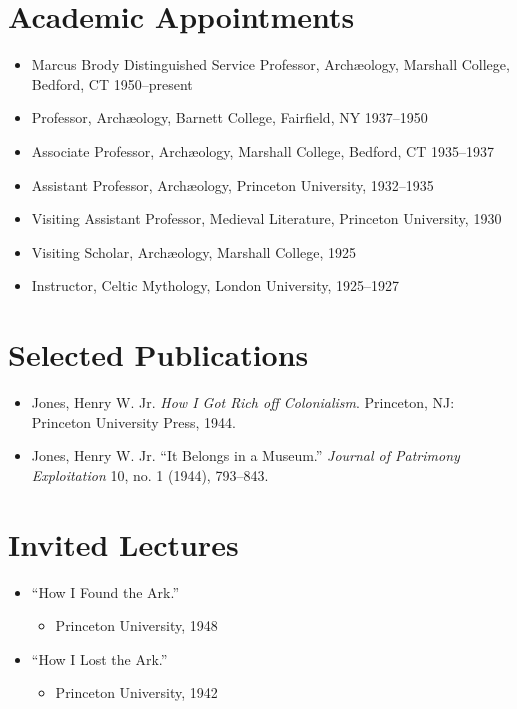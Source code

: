 \documentclass[%
    11pt,
  oneside
  ]{memoir}
\let\oldsection\section
\renewcommand{\section}[1]{%
  \oldsection{#1}
  \leavevmode
  \par
  \vspace{\dimexpr-\baselineskip-\parskip}
}
\begin{document}
\hypertarget{academic-appointments}{%
\section{Academic Appointments}\label{academic-appointments}}

\begin{itemize}
\tightlist
\item
  Marcus Brody Distinguished Service Professor, Archæology, Marshall
  College, Bedford, CT 1950--present
\item
  Professor, Archæology, Barnett College, Fairfield, NY 1937--1950
\item
  Associate Professor, Archæology, Marshall College, Bedford, CT
  1935--1937
\item
  Assistant Professor, Archæology, Princeton University, 1932--1935
\item
  Visiting Assistant Professor, Medieval Literature, Princeton
  University, 1930
\item
  Visiting Scholar, Archæology, Marshall College, 1925
\item
  Instructor, Celtic Mythology, London University, 1925--1927
\end{itemize}

\hypertarget{selected-publications}{%
\section{Selected Publications}\label{selected-publications}}

\begin{itemize}
\tightlist
\item
  Jones, Henry W. Jr. \emph{How I Got Rich off Colonialism}. Princeton,
  NJ: Princeton University Press, 1944.
\item
  Jones, Henry W. Jr. ``It Belongs in a Museum.'' \emph{Journal of
  Patrimony Exploitation} 10, no. 1 (1944), 793--843.
\end{itemize}

\hypertarget{invited-lectures}{%
\section{Invited Lectures}\label{invited-lectures}}

\begin{itemize}
\tightlist
\item
  ``How I Found the Ark.''

  \begin{itemize}
  \tightlist
  \item
    Princeton University, 1948
  \end{itemize}
\item
  ``How I Lost the Ark.''

  \begin{itemize}
  \tightlist
  \item
    Princeton University, 1942
  \end{itemize}
\end{itemize}
\end{document}
